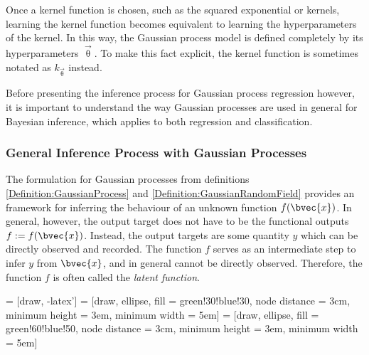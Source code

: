			Once a kernel function is chosen, such as the squared exponential or \matern kernels, learning the kernel function becomes equivalent to learning the hyperparameters of the kernel. In this way, the Gaussian process model is defined completely by its hyperparameters $\vec{\uptheta}$. To make this fact explicit, the kernel function is sometimes notated as $k_{\vec{\uptheta}}$ instead. %
			
			Before presenting the inference process for Gaussian process regression however, it is important to understand the way Gaussian processes are used in general for Bayesian inference, which applies to both regression and classification.
			
			\subsubsection{General Inference Process with Gaussian Processes}
			\label{Background:GaussianProcesses:Regression:GeneralGaussianProcessInferece}
			
				The formulation for Gaussian processes from definitions \ref{Definition:GaussianProcess} and \ref{Definition:GaussianRandomField} provides an framework for inferring the behaviour of an unknown function $f(\bvec{x})$. In general, however, the output target does not have to be the functional outputs $f := f(\bvec{x})$. Instead, the output targets are some quantity $y$ which can be directly observed and recorded. The function $f$ serves as an intermediate step to infer $y$ from $\bvec{x}$, and in general cannot be directly observed. Therefore, the function $f$ is often called the \textit{latent function}.
				
				 = [draw, -latex']
				 = [draw, ellipse, fill = green!30!blue!30, node distance = 3cm, minimum height = 3em,  minimum width = 5em]
				 = [draw, ellipse, fill = green!60!blue!50, node distance = 3cm, minimum height = 3em,  minimum width = 5em]
				
